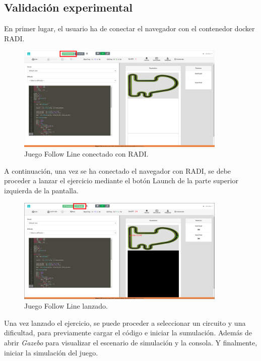 \documentclass[a4paper, 12pt]{book}
\begin{document}
\subsection{Validación experimental}

En primer lugar, el usuario ha de conectar el navegador con el contenedor docker RADI.

\begin{figure}[H]
	\centering
    \includegraphics[width=10cm]{img/fl_radi_connected_rect.png}
    \caption{Juego Follow Line conectado con RADI.}
    \label{figura:evaluator_drone}
\end{figure}

A continuación, una vez se ha conectado el navegador con RADI, se debe proceder a lanzar el ejercicio mediante el botón Launch de la parte superior izquierda de la pantalla.

\begin{figure}[H]
	\centering
    \includegraphics[width=10cm]{img/fl_connection_established_rect.png}
    \caption{Juego Follow Line lanzado.}
\end{figure}

Una vez lanzado el ejercicio, se puede proceder a seleccionar un circuito y una dificultad, para previamente cargar el código e iniciar la sumulación. Además de abrir \emph{Gazebo} para visualizar el escenario de simulación y la consola. Y finalmente, iniciar la simulación del juego.
\end{document}
